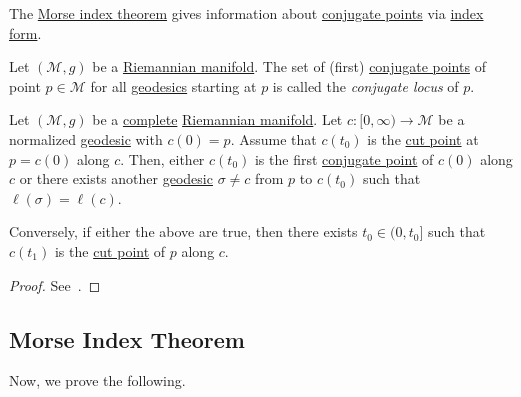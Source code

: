 \begin{intuition}
	The \hyperref[thm:Morse-index]{Morse index theorem} gives information about \hyperref[def:conjugate-point]{conjugate points} via \hyperref[def:index-form]{index form}.
\end{intuition}

\begin{definition}\label{def:conjugate-locus}
	Let \((\mathcal{M} , g)\) be a \hyperref[def:Riemannian-manifold]{Riemannian manifold}. The set of (first) \hyperref[def:conjugate-point]{conjugate points} of point \(p\in \mathcal{M} \) for all \hyperref[def:geodesic]{geodesics} starting at \(p\) is called the \emph{conjugate locus} of \(p\).
\end{definition}

\begin{proposition}
	Let \((\mathcal{M} , g)\) be a \hyperref[def:geodesically-complete]{complete} \hyperref[def:Riemannian-manifold]{Riemannian manifold}. Let \(c\colon [0, \infty ) \to \mathcal{M} \) be a normalized \hyperref[def:geodesic]{geodesic} with \(c(0) = p\). Assume that \(c(t_0)\) is the \hyperref[def:cut-point]{cut point} at \(p = c(0)\) along \(c\). Then, either \(c(t_0)\) is the first \hyperref[def:conjugate-point]{conjugate point} of \(c(0)\) along \(c\) or there exists another \hyperref[def:geodesic]{geodesic} \(\sigma \neq c\) from \(p\) to \(c(t_0)\) such that \(\ell (\sigma ) = \ell (c)\).

		Conversely, if either the above are true, then there exists \(t_0 \in (0, t_0]\) such that \(c(t_1)\) is the \hyperref[def:cut-point]{cut point} of \(p\) along \(c\).
\end{proposition}
\begin{proof}
	See~\cite{flaherty2013riemannian}.
\end{proof}

\subsection{Morse Index Theorem}
Now, we prove the following.


